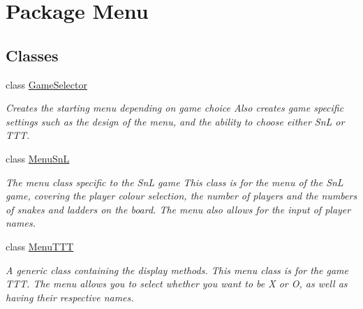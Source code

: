 \hypertarget{namespace_menu}{}\section{Package Menu}
\label{namespace_menu}
\subsection*{Classes}
\begin{DoxyCompactItemize}
\item 
class \hyperlink{class_menu_1_1_game_selector}{Game\+Selector}
\begin{DoxyCompactList}\small\item\em Creates the starting menu depending on game choice Also creates game specific settings such as the design of the menu, and the ability to choose either Sn\+L or T\+T\+T. \end{DoxyCompactList}\item 
class \hyperlink{class_menu_1_1_menu_sn_l}{Menu\+Sn\+L}
\begin{DoxyCompactList}\small\item\em The menu class specific to the Sn\+L game This class is for the menu of the Sn\+L game, covering the player colour selection, the number of players and the numbers of snakes and ladders on the board. The menu also allows for the input of player names. \end{DoxyCompactList}\item 
class \hyperlink{class_menu_1_1_menu_t_t_t}{Menu\+T\+T\+T}
\begin{DoxyCompactList}\small\item\em A generic class containing the display methods. This menu class is for the game T\+T\+T. The menu allows you to select whether you want to be X or O, as well as having their respective names. \end{DoxyCompactList}\end{DoxyCompactItemize}
